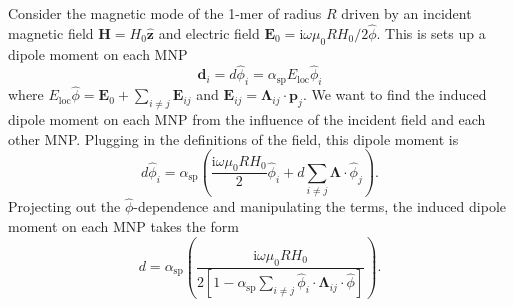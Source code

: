 \documentclass [11pt, proquest] {uwthesis}[2016/11/22]
\begin{document}
Consider the magnetic mode of the 1-mer of radius $R$ driven by an incident magnetic field $\textbf{H} = H_0\hat{\textbf{z}}$ and electric field $\textbf{E}_0 = \textrm{i}\omega\mu_0RH_0/2\hat{\phi}$. This is sets up a dipole moment on each MNP
\begin{equation}
\textbf{d}_i = d\hat{\phi}_i = \alpha_{\textrm{sp}}E_{\textrm{loc}}\hat{\phi}_i
\label{dipole_moment_1}
\end{equation}
where $E_{\textrm{loc}}\hat{\phi} = \textbf{E}_0 + \sum_{i\neq j}\textbf{E}_{ij}$ and $\textbf{E}_{ij} = \boldsymbol{\Lambda}_{ij}\cdot\textbf{p}_j$. We want to find the induced dipole moment on each MNP from the influence of the incident field and each other MNP. Plugging in the definitions of the field, this dipole moment is
\begin{equation}
d\hat{\phi}_i = \alpha_{\textrm{sp}}\left(\frac{\textrm{i}\omega\mu_0RH_0}{2}\hat{\phi}_i + d\sum_{i\neq j}\boldsymbol{\Lambda}\cdot\hat{\phi}_j\right).
\label{dipole_moment_2}
\end{equation}
Projecting out the $\hat{\phi}$-dependence and manipulating the terms, the induced dipole moment on each MNP takes the form
\begin{equation}
d = \alpha_{\textrm{sp}}\left(\frac{\textrm{i}\omega\mu_0RH_0}{2\left[1 - \alpha_{\textrm{sp}}\sum_{i\neq j}\hat{\phi}_i\cdot\boldsymbol{\Lambda}_{ij}\cdot\hat{\phi}\right]}\right).
\label{dipole_moment_3}
\end{equation}
\end{document}
